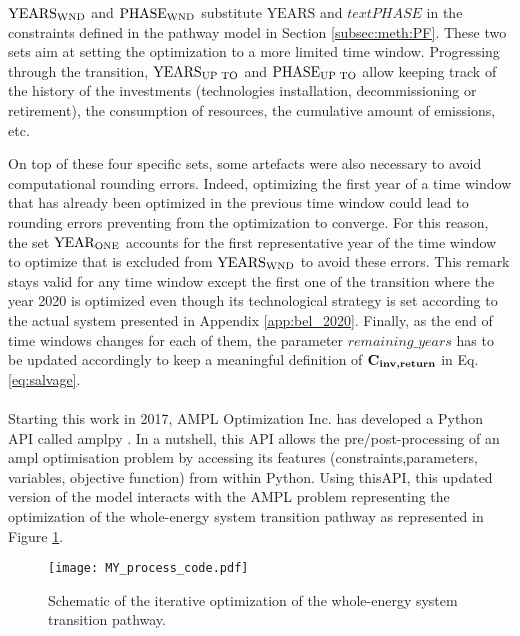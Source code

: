 $\text{YEARS}\textsubscript{WND}$ and $\text{PHASE}\textsubscript{WND}$ substitute $\text{YEARS}$ and $text{PHASE}$ in the constraints defined in the pathway model in Section \ref{subsec:meth:PF}. These two sets aim at setting the optimization to a more limited time window. Progressing through the transition, $\text{YEARS}\textsubscript{UP TO}$ and $\text{PHASE}\textsubscript{UP TO}$ allow keeping track of the history of the investments (\eg technologies installation, decommissioning or retirement), the consumption of resources, the cumulative amount of emissions, etc.

On top of these four specific sets, some artefacts were also necessary to avoid computational rounding errors. Indeed, optimizing the first year of a time window that has already been optimized in the previous time window could lead to rounding errors preventing from the optimization to converge. For this reason,  the set $\text{YEAR}\textsubscript{ONE}$ accounts for the first representative year of the time window to optimize that is excluded from $\text{YEARS}\textsubscript{WND}$ to avoid these errors. This remark stays valid for any time window except the first one of the transition where the year 2020 is optimized even though its technological strategy is set according to the actual system presented in Appendix \ref{app:bel_2020}. Finally, as the end of time windows changes for each of them, the parameter $remaining\_years$ has to be updated accordingly to keep a meaningful definition of $\textbf{C\textsubscript{inv,return}}$ in Eq. \ref{eq:salvage}.\\

\\

\noindent
Starting this work in 2017, AMPL Optimization Inc. has developed a Python \gls{API} called amplpy \cite{amplpy}. In a nutshell, this API allows the pre/post-processing of an ampl optimisation problem by accessing its features (\eg constraints,parameters, variables, objective function) from within Python. Using this\gls{API}, this updated version of the model interacts with the AMPL problem representing the optimization of the whole-energy system transition pathway as represented in Figure \ref{fig:MY_process_code}.


\begin{figure}[htbp!]
\centering
\texttt{[image: MY\_process\_code.pdf]}
\caption{Schematic of the iterative optimization of the whole-energy system transition pathway.}
\label{fig:MY_process_code}
\end{figure}

